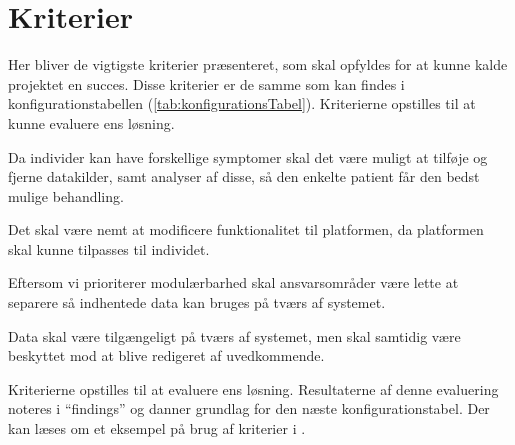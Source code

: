 \section{Kriterier}\label{firstsubseckriterier}
Her bliver de vigtigste kriterier præsenteret, som skal opfyldes for at kunne kalde projektet en succes.
Disse kriterier er de samme som kan findes i konfigurationstabellen (\cref{tab:konfigurationsTabel}).
Kriterierne opstilles til at kunne evaluere ens løsning.

\begin{description}[style=nextline]
	\item[Modulær] 
	Da individer kan have forskellige symptomer skal det være muligt at tilføje og fjerne datakilder, samt analyser af disse, så den enkelte patient får den bedst mulige behandling.
	\item[Fleksibel]
	Det skal være nemt at modificere funktionalitet til platformen, da platformen skal kunne tilpasses til individet.
	\item[Kombinerbar] Eftersom vi prioriterer modulærbarhed skal ansvarsområder være lette at separere så indhentede data kan bruges på tværs af systemet.
	\item[Kommunikativ] Data skal være tilgængeligt på tværs af systemet, men skal samtidig være beskyttet mod at blive redigeret af uvedkommende.
\end{description}

Kriterierne opstilles til at evaluere ens løsning.
Resultaterne af denne evaluering  noteres i ``findings'' og danner grundlag for den næste konfigurationstabel.
Der kan læses om et eksempel på brug af kriterier i \citet[Kapitel 2.2, 2.3, 2.4 og 2.5 side 16--21]{art:essence}.

